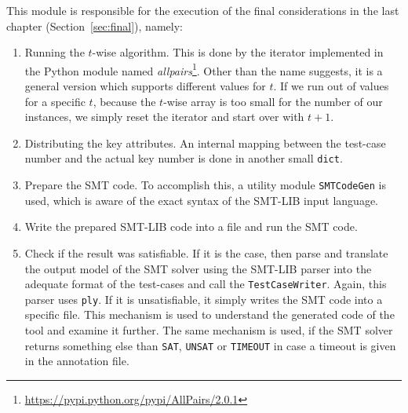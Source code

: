 This module is responsible for the execution of the final considerations in the last chapter (Section~\ref{sec:final}), namely:
\begin{enumerate}
 \item Running the $t$-wise algorithm. This is done by the iterator implemented in the Python module named \emph{allpairs}\footnote{\url{https://pypi.python.org/pypi/AllPairs/2.0.1}}. Other than the name suggests, it is a general version which supports different values for $t$. If we run out of values for a specific $t$, because the $t$-wise array is too small for the number of our instances, we simply reset the iterator and start over with $t+1$.
 
 \item Distributing the key attributes. An internal mapping between the test-case number and the actual key number is done in another small \verb|dict|.
 
 \item Prepare the SMT code. To accomplish this, a utility module \verb|SMTCodeGen| is used, which is aware of the exact syntax of the SMT-LIB input language.
 
 \item Write the prepared SMT-LIB code into a file and run the SMT code. 
 
 \item Check if the result was satisfiable. If it is the case, then parse and translate the output model of the SMT solver using the SMT-LIB parser into the adequate format of the test-cases and call the \texttt{Test\-Case\-Writer}. Again, this parser uses \texttt{ply}. If it is unsatisfiable, it simply writes the SMT code into a specific file. This mechanism is used to understand the generated code of the tool and examine it further. The same mechanism is used, if the SMT solver returns something else than \texttt{SAT}, \texttt{UNSAT} or \texttt{TIMEOUT} in case a timeout is given in the annotation file.
\end{enumerate}

